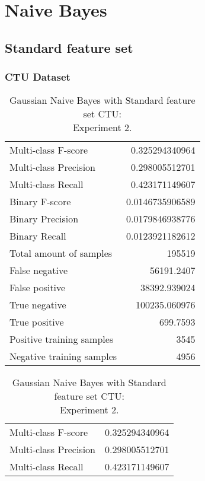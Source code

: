 
\chapter{Naive Bayes} %

\section{Standard feature set}
\subsection{CTU Dataset}

\begin{table}[H]
\begin{minipage}{0.5\textwidth}
\caption{Gaussian Naive Bayes with Standard feature set CTU: \\Experiment 1.}
\centering
\begin{tabular}{l r}
\toprule
Multi-class F-score & 0.325294340964 \\
Multi-class Precision & 0.298005512701 \\
Multi-class Recall & 0.423171149607 \\
\midrule
Binary F-score & 0.0146735906589 \\
Binary Precision & 0.0179846938776 \\
Binary Recall & 0.0123921182612 \\
\midrule
Total amount of samples & 195519 \\
False negative & 56191.2407 \\
False positive & 38392.939024 \\
True negative & 100235.060976 \\
True positive & 699.7593 \\
\midrule
Positive training samples & 3545 \\
Negative training samples & 4956 \\
\bottomrule
\end{tabular}
\end{minipage}
\hfillx
\begin{minipage}{0.5\textwidth}
\caption{Gaussian Naive Bayes with Standard feature set CTU: \\Experiment 2.}
\centering
\begin{tabular}{l r}
\toprule
Multi-class F-score & 0.325294340964 \\
Multi-class Precision & 0.298005512701 \\
Multi-class Recall & 0.423171149607 \\

\end{tabular}
\end{minipage}
\end{table}

